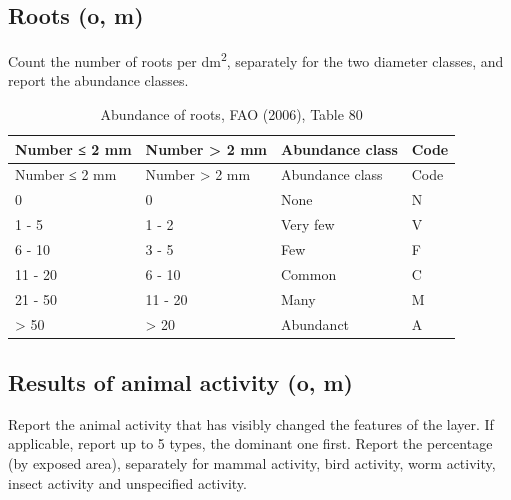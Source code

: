 \documentclass[
  letterpaper,
  DIV=11,
  numbers=noendperiod]{scrreprt}
\begin{document}
\hypertarget{roots-o-m}{%
\subsection{Roots (o, m)}\label{roots-o-m}}

Count the number of roots per dm\textsuperscript{2}, separately for the
two diameter classes, and report the abundance classes.

\begin{longtable}[]{@{}llll@{}}
\caption{Abundance of roots, FAO (2006), Table 80}\tabularnewline
\toprule()
Number ≤ 2 mm & Number \textgreater{} 2 mm & Abundance class & Code \\
\midrule()
\endfirsthead
\toprule()
Number ≤ 2 mm & Number \textgreater{} 2 mm & Abundance class & Code \\
\midrule()
\endhead
0 & 0 & None & N \\
1 - 5 & 1 - 2 & Very few & V \\
6 - 10 & 3 - 5 & Few & F \\
11 - 20 & 6 - 10 & Common & C \\
21 - 50 & 11 - 20 & Many & M \\
\textgreater{} 50 & \textgreater{} 20 & Abundanct & A \\
\bottomrule()
\end{longtable}

\hypertarget{results-of-animal-activity-o-m}{%
\subsection{Results of animal activity (o,
m)}\label{results-of-animal-activity-o-m}}

Report the animal activity that has visibly changed the features of the
layer. If applicable, report up to 5 types, the dominant one first.
Report the percentage (by exposed area), separately for mammal activity,
bird activity, worm activity, insect activity and unspecified activity.
\end{document}
